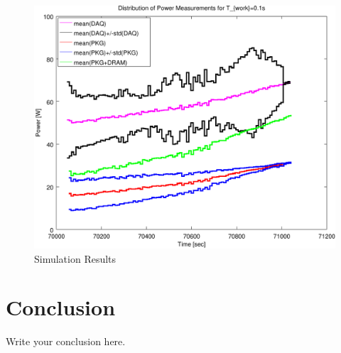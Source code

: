 \documentclass{article}
\begin{document}
\begin{figure}
    \centering
    \includegraphics[width=\textwidth]{insertDelayTw100msCropped}
    \caption{Simulation Results}
    \label{simulationfigure}
\end{figure}

\section{Conclusion}
Write your conclusion here.
\end{document}
